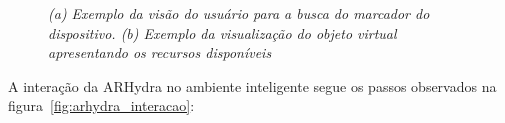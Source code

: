 	\begin{figure}[htb]
		\centering
		
		\caption{\textit{(a) Exemplo da visão do usuário para a busca do marcador do dispositivo. (b)
		Exemplo da visualização do objeto virtual apresentando os recursos disponíveis}}
		\label{fig:apresentacao_arhydra} 
	\end{figure}
	
	
	A interação da ARHydra no ambiente inteligente segue os passos observados na figura~\ref{fig:arhydra_interacao}:

